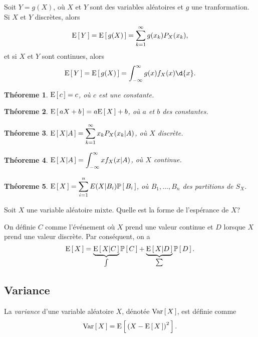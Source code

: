 \documentclass[11pt]{article}
\renewcommand\P[1]{%
	\ensuremath{%
		\mathbb{P}\left[\,#1\,\right]%
	}%
}%
\newcommand\Esp[1]{%
	\ensuremath{%
		\mathrm{E}\left[\,#1\,\right]%
	}%
}%
\newcommand\Espg[2]{%
	\ensuremath{%
		\mathrm{E}\left[\,#1\middle\vert#2\,\right]%
	}%
}%
\newcommand\Var[1]{%
	\ensuremath{%
		\mathrm{Var}\left[\,#1\,\right]%
	}%
}%
\newtheorem{theoreme}{Théoreme}[section]
\begin{document}
Soit $Y=g(X)$, où $X$ et $Y$ sont des variables aléatoires et $g$ une
tranformation. Si $X$ et $Y$ discrètes, alors
\begin{equation*}
	\Esp{Y}=\Esp{g(X)}=\sum_{k=1}^\infty g(x_k)P_X(x_k),
\end{equation*}
et si $X$ et $Y$ sont continues, alors
\begin{equation*}
	\Esp{Y}=\Esp{g(X)}=\int_{-\infty}^\infty g(x)f_X(x)\d{x}.
\end{equation*}

\begin{theoreme}
	$\Esp{c}=c$, où $c$ est une constante.
\end{theoreme}

\begin{theoreme}
	$\Esp{aX+b}=a\Esp{X}+b$, où $a$ et $b$ des constantes.
\end{theoreme}

\begin{theoreme}
	$\Espg{X}{A}=\displaystyle\sum_{k=1}^\infty x_kP_X(x_k|A)$, où $X$ discrète.
\end{theoreme}

\begin{theoreme}
	$\Espg{X}{A}=\displaystyle\int_{-\infty}^\infty xf_X(x|A)$, où $X$ continue.
\end{theoreme}

\begin{theoreme}
	$\Esp{X}=\displaystyle\sum_{i=1}^nE(X|B_i)\P{B_i}$, où $B_1,\dots,B_n$ des
	partitions de $S_X$.
\end{theoreme}

\begin{exemple}
	Soit $X$ une variable aléatoire mixte. Quelle est la forme de l'espérance
	de $X$?

	On définie $C$ comme l'événement où $X$ prend une valeur continue et $D$
	lorsque $X$ prend une valeur discrète. Par conséquent, on a
	\begin{equation*}
		\Esp{X}=\underbrace{\Espg{X}{C}}_{\int}\P{C}
		+\underbrace{\Espg{X}{D}}_{\sum}\P{D}.
	\end{equation*}
\end{exemple}

\subsection{Variance}
\begin{definition}
	La \textit{variance} d'une variable aléatoire $X$, dénotée $\Var{X}$, est
	définie comme
	\begin{equation*}
		\Var{X}=\Esp{\left(X-\Esp{X}\right)^2}.
	\end{equation*}
\end{definition}
\end{document}
